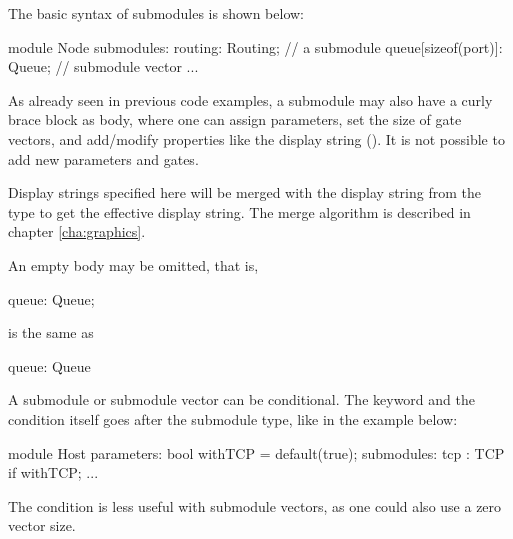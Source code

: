 The basic syntax of submodules is shown below:

\begin{ned}
module Node
{
    submodules:
        routing: Routing;   // a submodule
        queue[sizeof(port)]: Queue;  // submodule vector
        ...
}
\end{ned}

As already seen in previous code examples, a submodule may also have a
curly brace block as body, where one can assign parameters, set the size of
gate vectors, and add/modify properties like the display string
(). It is not possible to add new parameters and gates.

Display strings specified here will be merged with the display string
from the type to get the effective display string. The merge algorithm is
described in chapter \ref{cha:graphics}.


An empty body may be omitted, that is,

\begin{ned}
      queue: Queue;
\end{ned}

is the same as

\begin{ned}
      queue: Queue {
      }
\end{ned}

A submodule or submodule vector can be conditional. The 
keyword and the condition itself goes after the submodule type, like in the
example below:

\begin{ned}
module Host
{
    parameters:
        bool withTCP = default(true);
    submodules:
        tcp : TCP if withTCP;
        ...
}
\end{ned}

The condition is less useful with submodule vectors, as one could also
use a zero vector size.


